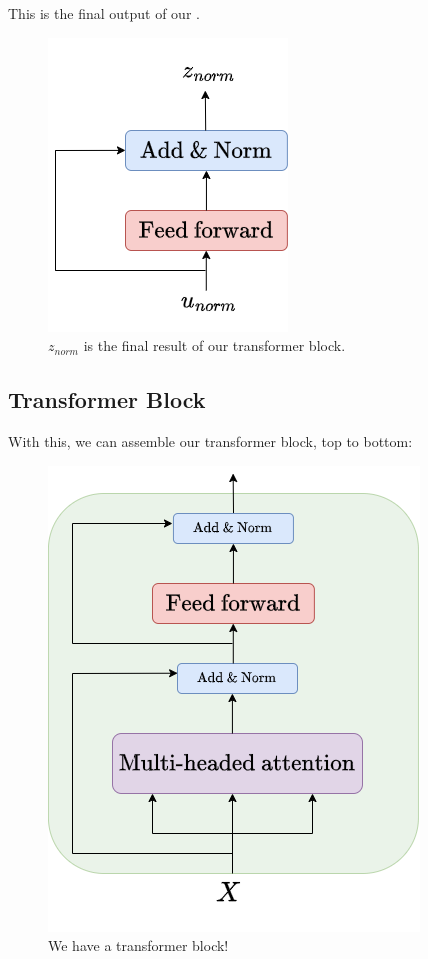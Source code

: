         This is the final output of our .

        \begin{figure}[H]
            \centering
            \includegraphics[width=0.2\linewidth]{images/transformers_images/feed_add_norm.png}
            \caption*{$z_{norm}$ is the final result of our transformer block.}
        \end{figure}


        

    \pagebreak  

    \subsection{Transformer Block}

        With this, we can assemble our transformer block, top to bottom:

        \begin{figure}[H]
            \centering
            \includegraphics[width=0.35\linewidth]{images/transformers_images/transformer_block.png}
            \caption*{We have a transformer block!}
        \end{figure}

